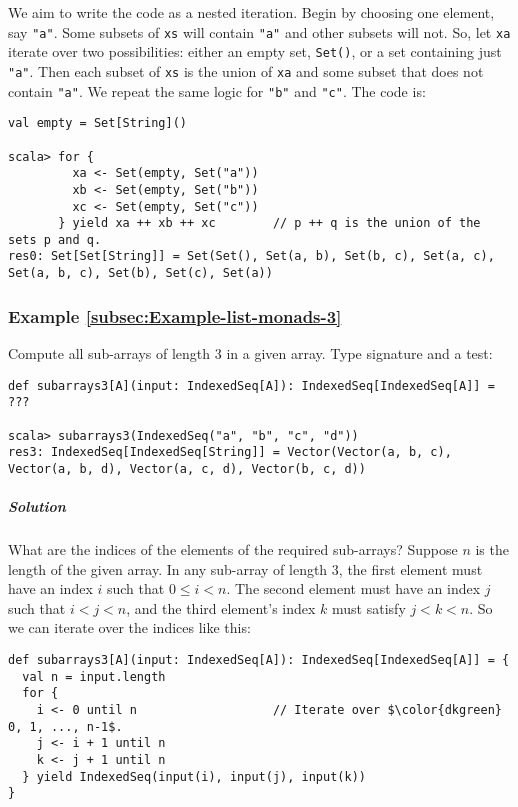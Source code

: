 We aim to write the code as a nested iteration. Begin by choosing
one element, say \lstinline!"a"!. Some subsets of \lstinline!xs!
will contain \lstinline!"a"! and other subsets will not. So, let
\lstinline!xa! iterate over two possibilities: either an empty set,
\lstinline!Set()!, or a set containing just \lstinline!"a"!. Then
each subset of \lstinline!xs! is the union of \lstinline!xa! and
some subset that does not contain \lstinline!"a"!. We repeat the
same logic for \lstinline!"b"! and \lstinline!"c"!. The code is:
\begin{lstlisting}
val empty = Set[String]()

scala> for {
         xa <- Set(empty, Set("a"))
         xb <- Set(empty, Set("b"))
         xc <- Set(empty, Set("c"))
       } yield xa ++ xb ++ xc        // p ++ q is the union of the sets p and q.
res0: Set[Set[String]] = Set(Set(), Set(a, b), Set(b, c), Set(a, c), Set(a, b, c), Set(b), Set(c), Set(a))
\end{lstlisting}


\subsubsection{Example \label{subsec:Example-list-monads-3}\ref{subsec:Example-list-monads-3}}

Compute all sub-arrays of length $3$ in a given array. Type signature
and a test:
\begin{lstlisting}
def subarrays3[A](input: IndexedSeq[A]): IndexedSeq[IndexedSeq[A]] = ???

scala> subarrays3(IndexedSeq("a", "b", "c", "d"))
res3: IndexedSeq[IndexedSeq[String]] = Vector(Vector(a, b, c), Vector(a, b, d), Vector(a, c, d), Vector(b, c, d))
\end{lstlisting}


\subparagraph{Solution}

What are the indices of the elements of the required sub-arrays? Suppose
$n$ is the length of the given array. In any sub-array of length
$3$, the first element must have an index $i$ such that $0\leq i<n$.
The second element must have an index $j$ such that $i<j<n$, and
the third element\textsf{'}s index $k$ must satisfy $j<k<n$. So we can iterate
over the indices like this:
\begin{lstlisting}[mathescape=true]
def subarrays3[A](input: IndexedSeq[A]): IndexedSeq[IndexedSeq[A]] = {
  val n = input.length
  for {
    i <- 0 until n                   // Iterate over $\color{dkgreen} 0, 1, ..., n-1$.
    j <- i + 1 until n
    k <- j + 1 until n
  } yield IndexedSeq(input(i), input(j), input(k))
}
\end{lstlisting}


